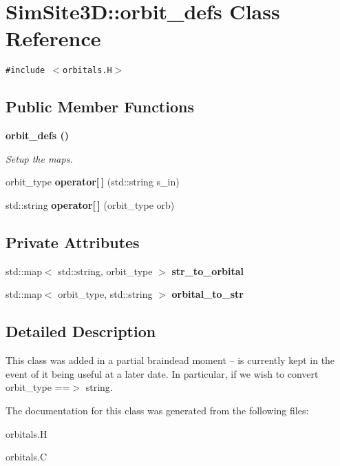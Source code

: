 \section{SimSite3D::orbit\_\-defs Class Reference}
\label{classSimSite3D_1_1orbit__defs}
{\tt \#include $<$orbitals.H$>$}

\subsection*{Public Member Functions}
\begin{CompactItemize}
\item 
\bf{orbit\_\-defs} ()\label{classSimSite3D_1_1orbit__defs_f178133e808b549a98b9354d0d97f046}

\begin{CompactList}\small\item\em Setup the maps. \item\end{CompactList}\item 
orbit\_\-type \textbf{operator[$\,$]} (std::string s\_\-in)\label{classSimSite3D_1_1orbit__defs_37a563c355bd0525a0f71e50e40face0}

\item 
std::string \textbf{operator[$\,$]} (orbit\_\-type orb)\label{classSimSite3D_1_1orbit__defs_4d11bbc4895cfd6c4a17f8f08c45b58a}

\end{CompactItemize}
\subsection*{Private Attributes}
\begin{CompactItemize}
\item 
std::map$<$ std::string, orbit\_\-type $>$ \textbf{str\_\-to\_\-orbital}\label{classSimSite3D_1_1orbit__defs_3eb7b5ab7d8ddd75f6ad4c5dc465ae4a}

\item 
std::map$<$ orbit\_\-type, std::string $>$ \textbf{orbital\_\-to\_\-str}\label{classSimSite3D_1_1orbit__defs_d78ded4fad9f010bafef5c8501998267}

\end{CompactItemize}


\subsection{Detailed Description}
This class was added in a partial braindead moment -- is currently kept in the event of it being useful at a later date. In particular, if we wish to convert orbit\_\-type ==$>$ string. 



The documentation for this class was generated from the following files:\begin{CompactItemize}
\item 
orbitals.H\item 
orbitals.C\end{CompactItemize}
